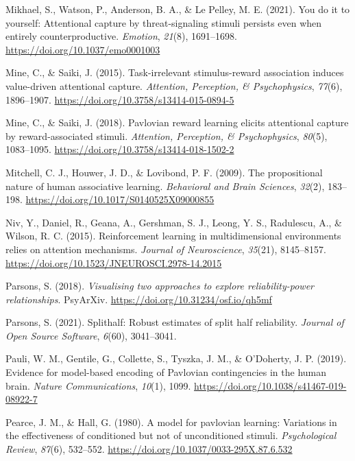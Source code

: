 \documentclass[
  man,
  floatsintext,
  longtable,
  nolmodern,
  notxfonts,
  notimes,
  mask,
  colorlinks=true,linkcolor=blue,citecolor=blue,urlcolor=blue]{apa7}
\newlength{\cslhangindent}
\newenvironment{CSLReferences}[2] %
 {\begin{list}{}{%
  \setlength{\itemindent}{0pt}
  \setlength{\leftmargin}{0pt}
  \setlength{\parsep}{0pt}
  \ifodd #1
   \setlength{\leftmargin}{\cslhangindent}
   \setlength{\itemindent}{-1\cslhangindent}
  \fi
  \setlength{\itemsep}{#2\baselineskip}}}
 {\end{list}}
\begin{document}
\begin{CSLReferences}{1}{0}
Mikhael, S., Watson, P., Anderson, B. A., \& Le Pelley, M. E. (2021).
You do it to yourself: Attentional capture by threat-signaling stimuli
persists even when entirely counterproductive. \emph{Emotion},
\emph{21}(8), 1691--1698. \url{https://doi.org/10.1037/emo0001003}

Mine, C., \& Saiki, J. (2015). Task-irrelevant stimulus-reward
association induces value-driven attentional capture. \emph{Attention,
Perception, \& Psychophysics}, \emph{77}(6), 1896--1907.
\url{https://doi.org/10.3758/s13414-015-0894-5}

Mine, C., \& Saiki, J. (2018). Pavlovian reward learning elicits
attentional capture by reward-associated stimuli. \emph{Attention,
Perception, \& Psychophysics}, \emph{80}(5), 1083--1095.
\url{https://doi.org/10.3758/s13414-018-1502-2}

Mitchell, C. J., Houwer, J. D., \& Lovibond, P. F. (2009). The
propositional nature of human associative learning. \emph{Behavioral and
Brain Sciences}, \emph{32}(2), 183--198.
\url{https://doi.org/10.1017/S0140525X09000855}

Niv, Y., Daniel, R., Geana, A., Gershman, S. J., Leong, Y. S.,
Radulescu, A., \& Wilson, R. C. (2015). Reinforcement learning in
multidimensional environments relies on attention mechanisms.
\emph{Journal of Neuroscience}, \emph{35}(21), 8145--8157.
\url{https://doi.org/10.1523/JNEUROSCI.2978-14.2015}

Parsons, S. (2018). \emph{Visualising two approaches to explore
reliability-power relationships}. PsyArXiv.
\url{https://doi.org/10.31234/osf.io/qh5mf}

Parsons, S. (2021). Splithalf: Robust estimates of split half
reliability. \emph{Journal of Open Source Software}, \emph{6}(60),
3041--3041.

Pauli, W. M., Gentile, G., Collette, S., Tyszka, J. M., \& O'Doherty, J.
P. (2019). Evidence for model-based encoding of Pavlovian contingencies
in the human brain. \emph{Nature Communications}, \emph{10}(1), 1099.
\url{https://doi.org/10.1038/s41467-019-08922-7}

Pearce, J. M., \& Hall, G. (1980). A model for pavlovian learning:
Variations in the effectiveness of conditioned but not of unconditioned
stimuli. \emph{Psychological Review}, \emph{87}(6), 532--552.
\url{https://doi.org/10.1037/0033-295X.87.6.532}


\end{CSLReferences}
\end{document}
